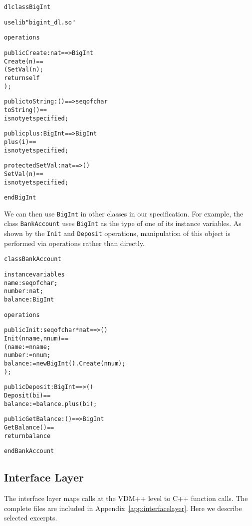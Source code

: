 \documentclass[\pformat,12pt]{article}
\begin{document}
\begin{alltt}
\textsf{dlclass} BigInt

\textsf{uselib} "bigint_dl.so"

\textsf{operations}

\textsf{public} Create : \textsf{nat} ==> BigInt
Create(n) ==
( SetVal(n);
  \textsf{return} self
);

\textsf{public} toString : () ==> \textsf{seq} \textsf{of} \textsf{char}
toString() ==
  \textsf{is} \textsf{not} \textsf{yet} \textsf{specified};

\textsf{public} plus : BigInt ==> BigInt
plus(i) ==
  \textsf{is} \textsf{not} \textsf{yet} \textsf{specified};

\textsf{protected} SetVal : \textsf{nat} ==> ()
SetVal(n) ==
  \textsf{is} \textsf{not} \textsf{yet} \textsf{specified};

\textsf{end} BigInt
\end{alltt}

We can then use \texttt{BigInt} in other classes in our
specification. For example, the class \texttt{BankAccount} uses 
\texttt{BigInt} as the type of one of its instance variables. As shown
by the \texttt{Init} and \texttt{Deposit} operations, manipulation of
this object is performed via operations 
rather than directly.

\begin{alltt}
\textsf{class} BankAccount

\textsf{instance} \textsf{variables}
  name : \textsf{seq} \textsf{of} \textsf{char};
  number : \textsf{nat};
  balance : BigInt

\textsf{operations}

\textsf{public} Init : \textsf{seq} \textsf{of} \textsf{char} * \textsf{nat} ==> ()
Init(nname, nnum) ==
( name := nname;
  number := nnum;
  balance := new BigInt().Create(nnum);
);

\textsf{public} Deposit : BigInt ==> ()
Deposit(bi) ==
  balance := balance.plus(bi);

\textsf{public} GetBalance : () ==> BigInt
GetBalance() ==
  \textsf{return} balance

\textsf{end} BankAccount
\end{alltt}


\subsection{Interface Layer}

The interface layer maps calls at the VDM++ level to C++ function
calls. The complete files are included in
Appendix~\ref{app:interfacelayer}. Here we describe selected excerpts.
\end{document}
